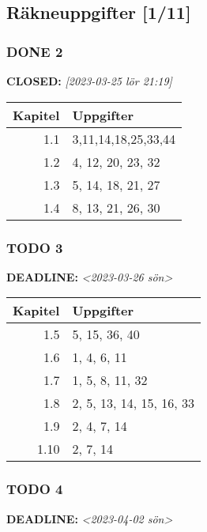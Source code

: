 \documentclass[11pt]{article}
\begin{document}
\subsection{Räkneuppgifter [1/11]}
\label{sec:org765d219}
\subsubsection{{\bfseries\sffamily DONE} 2}
\label{sec:orgd74c8c1}
\noindent\textbf{CLOSED:} \textit{[2023-03-25 lör 21:19]}\\[0pt]
\begin{center}
\begin{tabular}{rl}
Kapitel & Uppgifter\\[0pt]
\hline
1.1 & 3,11,14,18,25,33,44\\[0pt]
1.2 & 4, 12, 20, 23, 32\\[0pt]
1.3 & 5, 14, 18, 21, 27\\[0pt]
1.4 & 8, 13, 21, 26, 30\\[0pt]
\end{tabular}
\end{center}

\subsubsection{{\bfseries\sffamily TODO} 3}
\label{sec:org0df1c92}
\noindent\textbf{DEADLINE:} \textit{<2023-03-26 sön>}\\[0pt]

\begin{center}
\begin{tabular}{rl}
Kapitel & Uppgifter\\[0pt]
\hline
1.5 & 5, 15, 36, 40\\[0pt]
1.6 & 1, 4, 6, 11\\[0pt]
1.7 & 1, 5, 8, 11, 32\\[0pt]
1.8 & 2, 5, 13, 14, 15, 16, 33\\[0pt]
1.9 & 2, 4, 7, 14\\[0pt]
1.10 & 2, 7, 14\\[0pt]
\end{tabular}
\end{center}


\subsubsection{{\bfseries\sffamily TODO} 4}
\label{sec:orge52337a}
\noindent\textbf{DEADLINE:} \textit{<2023-04-02 sön>}\\[0pt]
\end{document}
